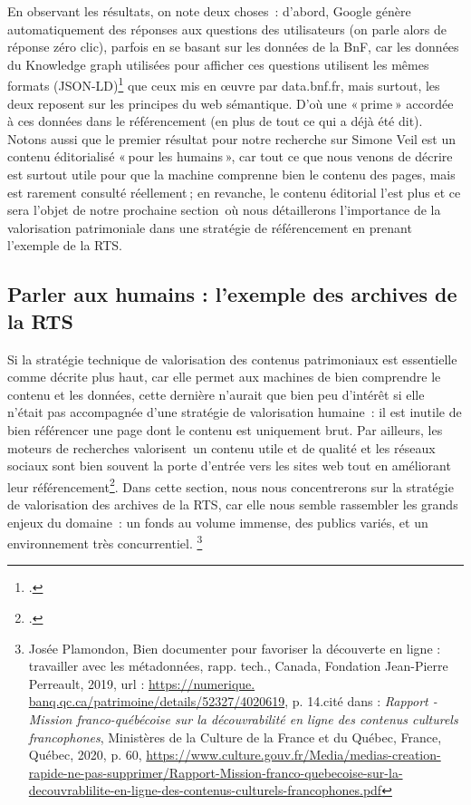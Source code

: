 En observant les résultats, on note deux choses : d’abord, Google génère automatiquement des réponses aux questions des utilisateurs (on parle alors de réponse zéro clic), parfois en se basant sur les données de la BnF, car les données du Knowledge graph utilisées pour afficher ces questions utilisent les mêmes formats (JSON-LD)\footcite{zotero-235} que ceux mis en œuvre par data.bnf.fr, mais surtout, les deux reposent sur les principes du web sémantique. D’où une « prime » accordée à ces données dans le référencement (en plus de tout ce qui a déjà été dit). Notons aussi que le premier résultat pour notre recherche sur Simone Veil est un contenu éditorialisé « pour les humains », car tout ce que nous venons de décrire est surtout utile pour que la machine comprenne bien le contenu des pages, mais est rarement consulté réellement ; en revanche, le contenu éditorial l’est plus et ce sera l’objet de notre prochaine section où nous détaillerons l’importance de la valorisation patrimoniale dans une stratégie de référencement en prenant l’exemple de la RTS.

\subsection{Parler aux humains : l'exemple des archives de la RTS}

Si la stratégie technique de valorisation des contenus patrimoniaux est essentielle comme décrite plus haut, car elle permet aux machines de bien comprendre le contenu et les données, cette dernière n’aurait que bien peu d’intérêt si elle n’était pas accompagnée d’une stratégie de valorisation humaine : il est inutile de bien référencer une page dont le contenu est uniquement brut. Par ailleurs, les moteurs de recherches valorisent un contenu utile et de qualité et les réseaux sociaux sont bien souvent la porte d’entrée vers les sites web tout en améliorant leur référencement\footcite{laura2022}. Dans cette section, nous nous concentrerons sur la stratégie de valorisation des archives de la RTS, car elle nous semble rassembler les grands enjeux du domaine : un fonds au volume immense, des publics variés, et un environnement très concurrentiel.
\footnote{Josée Plamondon, Bien documenter pour favoriser la découverte en ligne : travailler avec les métadonnées, rapp. tech., Canada, Fondation Jean-Pierre Perreault, 2019, url : \url{https://numerique.
		banq.qc.ca/patrimoine/details/52327/4020619}, p. 14.cité dans : \textit{Rapport - Mission franco-québécoise sur la découvrabilité en ligne des contenus culturels francophones}, Ministères de la Culture de la France et du Québec, France, Québec, 2020, p. 60, \url{https://www.culture.gouv.fr/Media/medias-creation-rapide-ne-pas-supprimer/Rapport-Mission-franco-quebecoise-sur-la-decouvrablilite-en-ligne-des-contenus-culturels-francophones.pdf}}



